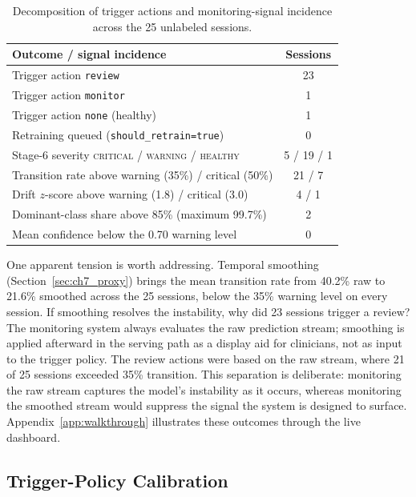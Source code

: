 \renewcommand{\arraystretch}{1.2}
\begin{table}[htbp]
\centering
\footnotesize
\caption[Decomposition of trigger actions and monitoring-signal incidence...]{Decomposition of trigger actions and monitoring-signal incidence across the 25 unlabeled sessions.}
\label{tab:ch7_decomposition}
\begin{tabular}{lc}
\toprule
\textbf{Outcome / signal incidence} & \textbf{Sessions} \\
\midrule
Trigger action \texttt{review} & 23 \\
Trigger action \texttt{monitor} & 1 \\
Trigger action \texttt{none} (healthy) & 1 \\
Retraining queued (\texttt{should\_retrain=true}) & 0 \\
\midrule
Stage-6 severity \textsc{critical} / \textsc{warning} / \textsc{healthy} & 5 / 19 / 1 \\
Transition rate above warning (35\%) / critical (50\%) & 21 / 7 \\
Drift $z$-score above warning (1.8) / critical (3.0) & 4 / 1 \\
Dominant-class share above 85\% (maximum 99.7\%) & 2 \\
Mean confidence below the 0.70 warning level & 0 \\
\bottomrule
\end{tabular}
\renewcommand{\arraystretch}{1.0}
\end{table}
\FloatBarrier

One apparent tension is worth addressing. Temporal smoothing (Section~\ref{sec:ch7_proxy}) brings the mean transition rate from 40.2\% raw to 21.6\% smoothed across the 25 sessions, below the 35\% warning level on every session. If smoothing resolves the instability, why did 23 sessions trigger a review? The monitoring system always evaluates the raw prediction stream; smoothing is applied afterward in the serving path as a display aid for clinicians, not as input to the trigger policy. The review actions were based on the raw stream, where 21 of 25 sessions exceeded 35\% transition. This separation is deliberate: monitoring the raw stream captures the model's instability as it occurs, whereas monitoring the smoothed stream would suppress the signal the system is designed to surface. Appendix~\ref{app:walkthrough} illustrates these outcomes through the live dashboard.

\subsection{Trigger-Policy Calibration}
\label{sec:ch7_triggerpolicy}

